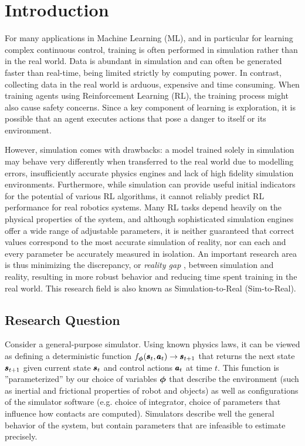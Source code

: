 \chapter{Introduction}
\label{introduction}
For many applications in Machine Learning (ML), and in particular for learning complex continuous control, training is often performed in simulation rather than in the real world. Data is abundant in simulation and can often be generated faster than real-time, being limited strictly by computing power. In contrast, collecting data in the real world is arduous, expensive and time consuming. When training agents using Reinforcement Learning (RL), the training process might also cause safety concerns. Since a key component of learning is exploration, it is possible that an agent executes actions that pose a danger to itself or its environment.

However, simulation comes with drawbacks: a model trained solely in simulation may behave very differently when transferred to the real world due to modelling errors, insufficiently accurate physics engines and lack of high fidelity simulation environments. Furthermore, while simulation can provide useful initial indicators for the potential of various RL algorithms, it cannot reliably predict RL performance for real robotics systems. Many RL tasks depend heavily on the physical properties of the system, and although sophisticated simulation engines offer a wide range of adjustable parameters, it is neither guaranteed that correct values correspond to the most accurate simulation of reality, nor can each and every parameter be accurately measured in isolation. An important research area is thus minimizing the discrepancy, or \emph{reality gap} \parencite{Jakobi1995NoiseAT}, between simulation and reality, resulting in more robust behavior and reducing time spent training in the real world. This research field is also known as Simulation-to-Real (Sim-to-Real).

\section{Research Question}

Consider a general-purpose simulator. Using known physics laws, it can be viewed as defining a deterministic function $f_{\boldsymbol{\phi}}(\pmb{s}_t, \pmb{a}_t) \rightarrow \pmb{s}_{t+1}$ that returns the next state $\pmb{s}_{t+1}$ given current state $\pmb{s}_t$ and control actions $\pmb{a}_t$ at time $t$. This function is ''parameterized'' by our choice of variables $\boldsymbol{\phi}$ that describe the environment (such as inertial and frictional properties of robot and objects) as well as configurations of the simulator software (e.g. choice of integrator, choice of parameters that influence how contacts are computed). Simulators describe well the general behavior of the system, but contain parameters that are infeasible to estimate precisely.%

